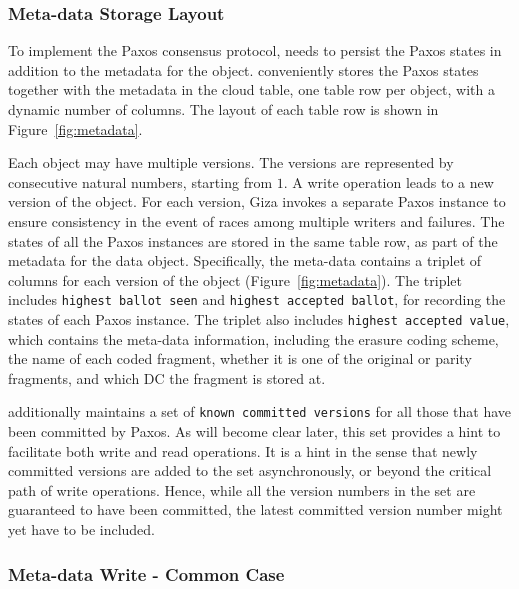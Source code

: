 \subsubsection{Meta-data Storage Layout}

To implement the Paxos consensus protocol,
\name needs to persist the Paxos states in addition to the metadata for the object.
{\name} conveniently stores the Paxos states together with the metadata in the cloud table,
one table row per object, with a dynamic number of columns. The layout of each table row is
shown in Figure~\ref{fig:metadata}.

Each object may have multiple versions.
The versions are represented by consecutive natural numbers, starting from $1$.
A \name write operation leads to a new version of the object.
For each version, Giza invokes a separate Paxos instance to ensure consistency
in the event of races among multiple writers and failures.
The states of all the Paxos instances are stored in the same table row,
as part of the metadata for the data object.
Specifically, the meta-data contains a triplet of columns for each version of the object
(Figure~\ref{fig:metadata}).
The triplet includes {\tt highest ballot seen} and {\tt highest accepted ballot},
for recording the states of each Paxos instance.
The triplet also includes {\tt highest accepted value},
which contains the meta-data information, including the erasure coding scheme,
the name of each coded fragment, whether it is one of the original or parity fragments,
and which DC the fragment is stored at.

{\name} additionally maintains a set of {\tt known committed versions} 
for all those that have been committed by Paxos. As will become clear later,
this set provides a hint to facilitate both write and read operations.
It is a hint in the sense that newly committed versions are added to the set asynchronously,
or beyond the critical path of write operations.
Hence, while all the version numbers in the set are guaranteed to have been committed,
the latest committed version number might yet have to be included.

\subsubsection{Meta-data Write - Common Case}

